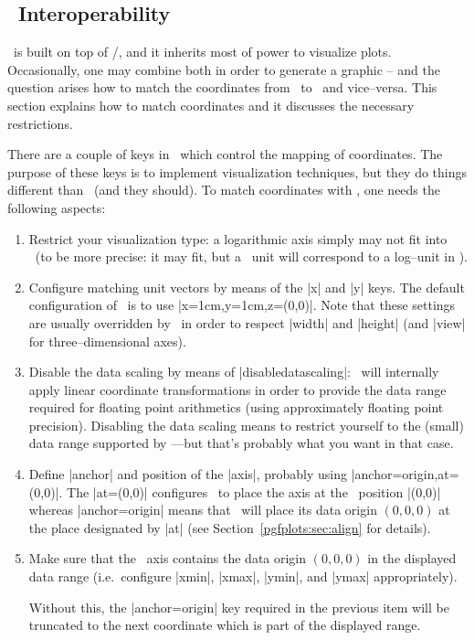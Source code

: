 \subsection{\tikzname\ Interoperability}
\label{pgfplots:tikz:interoperability}

\PGFPlots\ is built on top of \Tikz/\pgfname, and it inherits most of power to visualize plots. Occasionally, one may combine both in order to generate a graphic -- and the question arises how to match the coordinates from \Tikz\ to \PGFPlots\ and vice--versa. This section explains how to match coordinates and it discusses the necessary restrictions.

There are a couple of keys in \PGFPlots\ which control the mapping of coordinates. The purpose of these keys is to implement visualization techniques, but they do things different than \Tikz\ (and they should). To match coordinates with \Tikz, one needs the following aspects:
\begin{enumerate}
	\item Restrict your visualization type: a logarithmic axis simply may not fit into \Tikz\ (to be more precise: it may fit, but a \Tikz\ unit will correspond to a log--unit in \PGFPlots).

	\item Configure matching unit vectors by means of the |x| and |y| keys. The default configuration of \Tikz\ is to use |x=1cm,y=1cm,z={(0,0)}|. Note that these settings are usually overridden by \PGFPlots\ in order to respect |width| and |height| (and |view| for three--dimensional axes).
	\item Disable the data scaling by means of |disabledatascaling|: \PGFPlots\ will internally apply linear coordinate transformations in order to provide the data range required for floating point arithmetics (using approximately floating point precision). Disabling the data scaling means to restrict yourself to the (small) data range supported by \Tikz---but that's probably what you want in that case.
	\item Define |anchor| and position of the |axis|, probably using |anchor=origin,at={(0,0)}|. The |at={(0,0)}| configures \PGFPlots\ to place the axis at the \Tikz\ position |(0,0)| whereas |anchor=origin| means that \PGFPlots\ will place its data origin $(0,0,0)$ at the place designated by |at| (see Section~\ref{pgfplots:sec:align} for details).

	\item Make sure that the \PGFPlots\ axis contains the data origin $(0,0,0)$ in the displayed data range (i.e.\ configure |xmin|, |xmax|, |ymin|, and |ymax| appropriately).

	Without this, the |anchor=origin| key required in the previous item will be truncated to the next coordinate which is part of the displayed range.
\end{enumerate}

